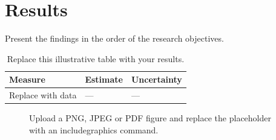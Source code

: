 \chapter{Results}
\label{chap:results}
Present the findings in the order of the research objectives.
\begin{table}[htbp]
\centering
\begin{tabular}{lll}
\toprule
Measure & Estimate & Uncertainty \\
\midrule
Replace with data & --- & --- \\
\bottomrule
\end{tabular}
\caption{Replace this illustrative table with your results.}
\label{tab:results}
\end{table}
\begin{figure}[htbp]
\centering
{}
\caption{Upload a PNG, JPEG or PDF figure and replace the placeholder with an includegraphics command.}
\label{fig:overview}
\end{figure}
